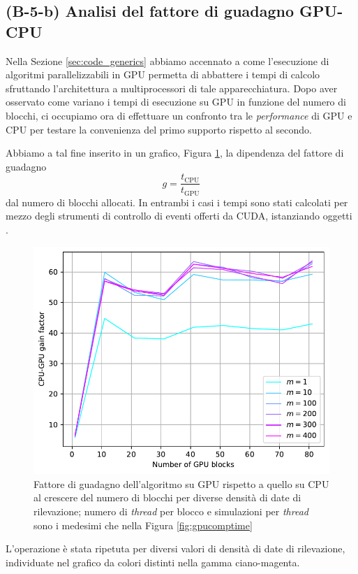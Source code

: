 \subsection{(B-5-b) Analisi del fattore di guadagno GPU-CPU}

Nella Sezione \ref{sec:code_generics} abbiamo accennato a come l'esecuzione di algoritmi parallelizzabili in GPU permetta di abbattere i tempi di calcolo sfruttando l'architettura a multiprocessori di tale apparecchiatura. Dopo aver osservato come variano i tempi di esecuzione su GPU in funzione del numero di blocchi, ci occupiamo ora di effettuare un confronto tra le \textit{performance} di GPU e CPU per testare la convenienza del primo supporto rispetto al secondo.

Abbiamo a tal fine inserito in un grafico, Figura \ref{fig:gainfactor}, la dipendenza del fattore di guadagno
\begin{equation}
     g = \frac{t_\text{CPU}}{t_\text{GPU}}
\end{equation}
dal numero di blocchi allocati. In entrambi i casi i tempi sono stati calcolati per mezzo degli strumenti di controllo di eventi offerti da CUDA, istanziando oggetti .

\begin{figure}[t]
    \centering
    \includegraphics[scale=0.5]{graphs/GainFactor_Tesla_GainFactorVsBlocks_VariousM.pdf}
    \caption[Fattore di guadagno al crescere del numero di blocchi per diverse densità di date di rilevazione.]{Fattore di guadagno dell'algoritmo su GPU rispetto a quello su CPU al crescere del numero di blocchi per diverse densità di date di rilevazione; numero di \textit{thread} per blocco e simulazioni per \textit{thread} sono i medesimi che nella Figura \ref{fig:gpucomptime}}
    \label{fig:gainfactor}
\end{figure}
L'operazione è stata ripetuta per diversi valori di densità di date di rilevazione, individuate nel grafico da colori distinti nella gamma ciano-magenta.

